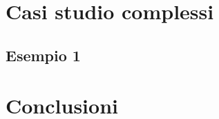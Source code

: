 \documentclass{article}
\begin{document}

\section{Casi studio complessi}

\subsection{Esempio 1}
\label{sec:complesso1}


\section{Conclusioni}




\end{document}
